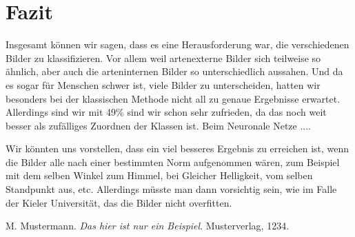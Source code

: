 \documentclass[a4,german]{article}
\begin{document}
\section{Fazit}


Insgesamt können wir sagen, dass es eine Herausforderung war, die verschiedenen Bilder zu klassifizieren. Vor allem weil artenexterne Bilder sich teilweise so ähnlich, aber auch die arteninternen Bilder so unterschiedlich aussahen. Und da es sogar für Menschen schwer ist, viele Bilder zu unterscheiden, hatten wir besonders bei der klassischen Methode nicht all zu genaue Ergebnisse erwartet.
Allerdings sind wir mit 49\% sind wir schon sehr zufrieden, da das noch weit besser als zufälliges Zuordnen der Klassen ist.
Beim Neuronale Netze ....

Wir könnten uns vorstellen, dass ein viel besseres Ergebnis zu erreichen ist, wenn die Bilder alle nach einer bestimmten Norm aufgenommen wären, zum Beispiel mit dem selben Winkel zum Himmel, bei Gleicher Helligkeit, vom selben Standpunkt aus, etc. Allerdings müsste man dann vorsichtig sein, wie im Falle der Kieler Universität, das die Bilder nicht overfitten. 


\begin{thebibliography}{99}
	
 M. Mustermann. \textit{Das hier ist nur ein Beispiel}. Musterverlag, 1234.

\end{thebibliography}
\end{document}
